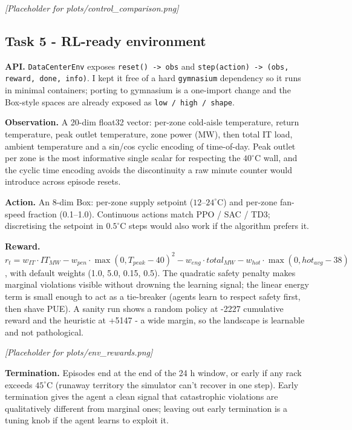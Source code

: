 \documentclass[letterpaper,11pt]{article}
\begin{document}
	\begin{center}
		\textit{[Placeholder for plots/control\_comparison.png]}
	\end{center}
	
	\subsection{Task 5 - RL-ready environment}
	\textbf{API.} \texttt{DataCenterEnv} exposes \texttt{reset() -> obs} and \texttt{step(action) -> (obs, reward, done, info)}. I kept it free of a hard \texttt{gymnasium} dependency so it runs in minimal containers; porting to gymnasium is a one-import change and the Box-style spaces are already exposed as \texttt{low / high / shape}.
	
	\textbf{Observation.} A 20-dim float32 vector: per-zone cold-aisle temperature, return temperature, peak outlet temperature, zone power (MW), then total IT load, ambient temperature and a sin/cos cyclic encoding of time-of-day. Peak outlet per zone is the most informative single scalar for respecting the $40^\circ\text{C}$ wall, and the cyclic time encoding avoids the discontinuity a raw minute counter would introduce across episode resets.
	
	\textbf{Action.} An 8-dim Box: per-zone supply setpoint ($12\text{--}24^\circ\text{C}$) and per-zone fan-speed fraction (0.1--1.0). Continuous actions match PPO / SAC / TD3; discretising the setpoint in $0.5^\circ\text{C}$ steps would also work if the algorithm prefers it.
	
	\textbf{Reward.} $r_t = w_{IT} \cdot IT_{MW} - w_{pen} \cdot \max(0, T_{peak}-40)^2 - w_{eng} \cdot total_{MW} - w_{hot} \cdot \max(0, hot_{avg}-38)$, with default weights (1.0, 5.0, 0.15, 0.5). The quadratic safety penalty makes marginal violations visible without drowning the learning signal; the linear energy term is small enough to act as a tie-breaker (agents learn to respect safety first, then shave PUE). A sanity run shows a random policy at -2227 cumulative reward and the heuristic at +5147 - a wide margin, so the landscape is learnable and not pathological.
	
	\begin{center}
		\textit{[Placeholder for plots/env\_rewards.png]}
	\end{center}
	
	\textbf{Termination.} Episodes end at the end of the 24 h window, or early if any rack exceeds $45^\circ\text{C}$ (runaway territory the simulator can't recover in one step). Early termination gives the agent a clean signal that catastrophic violations are qualitatively different from marginal ones; leaving out early termination is a tuning knob if the agent learns to exploit it.
	
\end{document}
